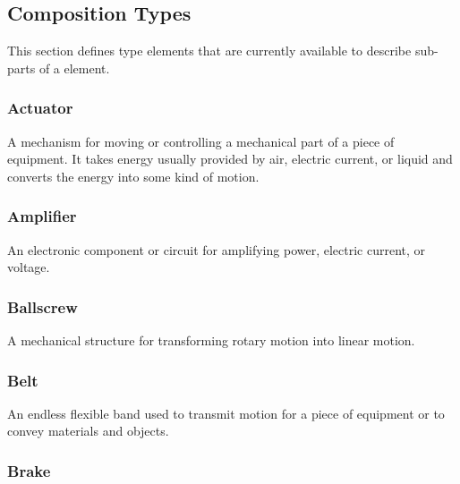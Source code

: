 \subsection{Composition Types} \label{sec:Composition Types}


This section defines  type elements that are currently available to describe sub-parts of a  element.


\subsubsection{Actuator}




A mechanism for moving or controlling a mechanical part of a piece of equipment.   
 It takes energy usually provided by air, electric current, or liquid and converts the energy into some kind of motion. 

\FloatBarrier

\subsubsection{Amplifier}
\label{sec:Amplifier}



An electronic component or circuit for amplifying power, electric current, or voltage.

\FloatBarrier

\subsubsection{Ballscrew}
\label{sec:Ballscrew}



A mechanical structure for transforming rotary motion into linear motion.

\FloatBarrier

\subsubsection{Belt}
\label{sec:Belt}



An endless flexible band used to transmit motion for a piece of equipment or to convey materials and objects.

\FloatBarrier

\subsubsection{Brake}
\label{sec:Brake}



